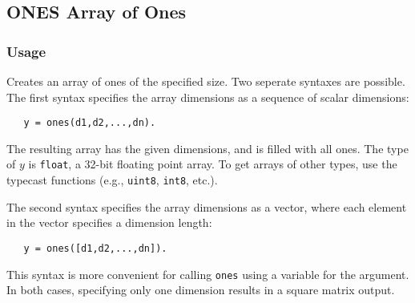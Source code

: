 %
%
%
\subsection{ONES Array of Ones}
\subsubsection{Usage}
Creates an array of ones of the specified size.  Two seperate 
syntaxes are possible.  The first syntax specifies the array 
dimensions as a sequence of scalar dimensions:
\begin{verbatim}
   y = ones(d1,d2,...,dn).
\end{verbatim}
The resulting array has the given dimensions, and is filled with
all ones.  The type of $y$ is \verb|float|, a 32-bit floating
point array.  To get arrays of other types, use the typecast 
functions (e.g., \verb|uint8|, \verb|int8|, etc.).
    
The second syntax specifies the array dimensions as a vector,
where each element in the vector specifies a dimension length:
\begin{verbatim}
   y = ones([d1,d2,...,dn]).
\end{verbatim}
This syntax is more convenient for calling \verb|ones| using a 
variable for the argument.  In both cases, specifying only one
dimension results in a square matrix output.
